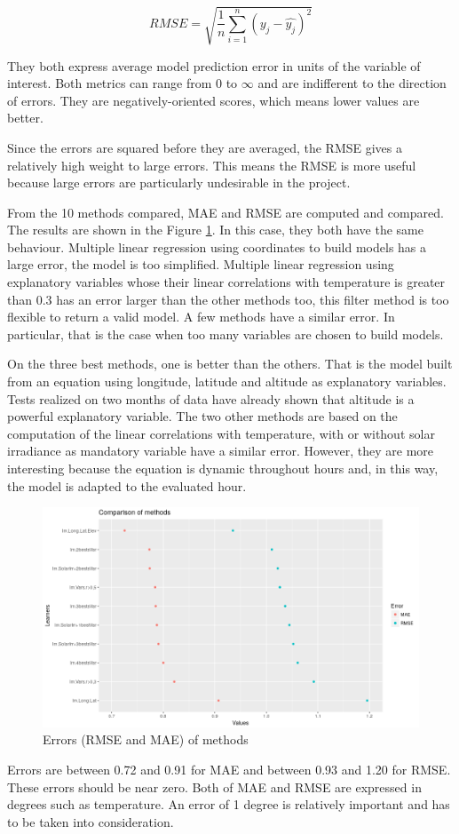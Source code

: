 \documentclass[12pt,twoside]{reedthesis}
\theoremstyle{definition}
\theoremstyle{definition}
\theoremstyle{definition}
\theoremstyle{remark}
\begin{document}
\[
RMSE = \sqrt{\frac{1}{n} \sum_{i=1}^{n}{( y_{j} - \widehat{y_{j}} )^2}}
\]

They both express average model prediction error in units of the
variable of interest. Both metrics can range from 0 to \(\infty\) and
are indifferent to the direction of errors. They are negatively-oriented
scores, which means lower values are better.

Since the errors are squared before they are averaged, the RMSE gives a
relatively high weight to large errors. This means the RMSE is more
useful because large errors are particularly undesirable in the project.

From the 10 methods compared, MAE and RMSE are computed and compared.
The results are shown in the Figure \ref{fig:meanerror}. In this case,
they both have the same behaviour. Multiple linear regression using
coordinates to build models has a large error, the model is too
simplified. Multiple linear regression using explanatory variables whose
their linear correlations with temperature is greater than 0.3 has an
error larger than the other methods too, this filter method is too
flexible to return a valid model. A few methods have a similar error. In
particular, that is the case when too many variables are chosen to build
models.

On the three best methods, one is better than the others. That is the
model built from an equation using longitude, latitude and altitude as
explanatory variables. Tests realized on two months of data have already
shown that altitude is a powerful explanatory variable. The two other
methods are based on the computation of the linear correlations with
temperature, with or without solar irradiance as mandatory variable have
a similar error. However, they are more interesting because the equation
is dynamic throughout hours and, in this way, the model is adapted to
the evaluated hour.
\begin{figure}

{\centering \includegraphics[width=0.9\linewidth]{figure/meanerror} 

}

\caption{Errors (RMSE and MAE) of methods}\label{fig:meanerror}
\end{figure}
Errors are between 0.72 and 0.91 for MAE and between 0.93 and 1.20 for
RMSE. These errors should be near zero. Both of MAE and RMSE are
expressed in degrees such as temperature. An error of 1 degree is
relatively important and has to be taken into consideration.
\end{document}
